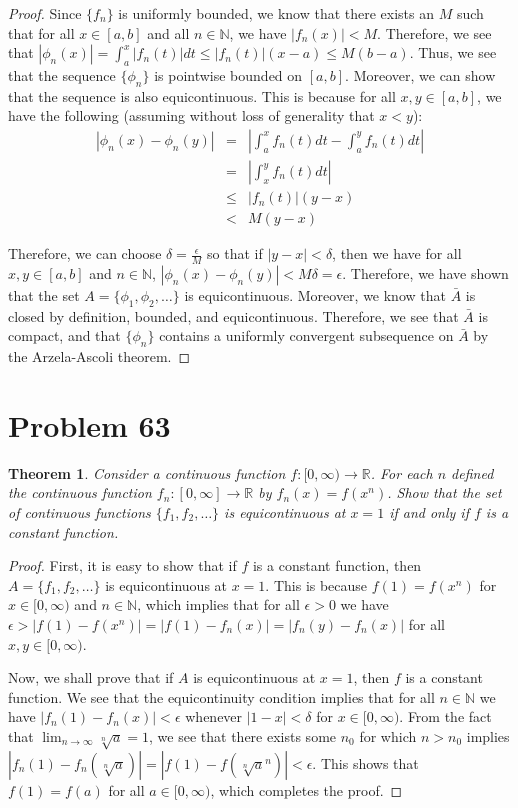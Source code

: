 \documentclass[psamsfonts]{amsart}
\newtheorem{thm}{Theorem}[section]
\theoremstyle{definition}
\theoremstyle{remark}
\numberwithin{equation}{section}
\begin{document}
\begin{proof}
Since $\{ f_n \}$ is uniformly bounded, we know that there exists an $M$ such that for all $x \in [a,b]$ and all $n \in \mathbb{N}$, we have $|f_n(x)| < M$. Therefore, we see that $|\phi_n(x)| = \int_a^x |f_n(t)| dt \leq |f_n(t)| (x - a) \leq M (b-a)$. Thus, we see that the sequence $\{ \phi_n \}$ is pointwise bounded on $[a,b]$. Moreover, we can show that the sequence is also equicontinuous. This is because for all $x,y \in [a,b]$, we have the following (assuming without loss of generality that $x < y$):
\begin{eqnarray}
| \phi_n(x) - \phi_n(y)| &=& \left| \int_a^x f_n(t) dt - \int_a^y f_n(t) dt \right| \\
&=& \left| \int_x^y f_n(t) dt \right| \\
&\leq& |f_n(t)| (y- x) \\
&<& M (y-x)
\end{eqnarray}

Therefore, we can choose $\delta = \frac{\epsilon}{M}$ so that if $|y-x| < \delta$, then we have for all $x,y \in [a,b]$ and $n \in \mathbb{N}$, $| \phi_n(x) - \phi_n(y)| < M \delta = \epsilon$. Therefore, we have shown that the set $A = \{ \phi_1, \phi_2, \ldots \}$ is equicontinuous. Moreover, we know that $\bar{A}$ is closed by definition, bounded, and equicontinuous. Therefore, we see that $\bar{A}$ is compact, and that $\{ \phi_n \}$ contains a uniformly convergent subsequence on $\bar{A}$ by the Arzela-Ascoli theorem.
\end{proof}

\section{Problem 63}

\begin{thm}
Consider a continuous function $f:[0,\infty) \to \mathbb{R}$. For each $n$ defined the continuous function $f_n: [0,\infty] \to \mathbb{R}$ by $f_n(x) = f(x^n)$. Show that the set of continuous functions $\{ f_1, f_2, \ldots \}$ is equicontinuous at $x=1$ if and only if $f$ is a constant function.
\end{thm}

\begin{proof}
First, it is easy to show that if $f$ is a constant function, then $A = \{f_1, f_2, \ldots \}$ is equicontinuous at $x =1$. This is because $f(1) = f(x^n)$ for $x \in [0,\infty)$ and $n \in \mathbb{N}$, which implies that for all $\epsilon > 0$ we have $\epsilon > |f(1) - f(x^n)| = |f(1) - f_n(x)| = |f_n(y) - f_n(x)|$ for all $x,y \in [0,\infty)$. 

Now, we shall prove that if $A$ is equicontinuous at $x=1$, then $f$ is a constant function. We see that the equicontinuity condition implies that for all $n \in \mathbb{N}$ we have $|f_n(1) - f_n(x)| < \epsilon$ whenever $|1-x| < \delta$ for $x \in [0,\infty)$. From the fact that $\lim_{n \to \infty} \sqrt[n]{a} = 1$, we see that there exists some $n_0$ for which $n > n_0$ implies $|f_n(1) - f_n(\sqrt[n]{a})| = |f(1) - f(\sqrt[n]{a}^n)| < \epsilon$. This shows that $f(1) = f(a)$ for all $a \in [0,\infty)$, which completes the proof.
\end{proof}
\end{document}
